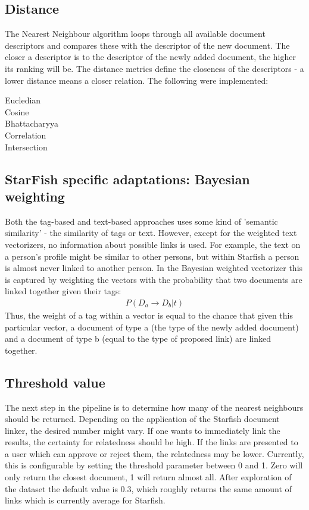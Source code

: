 \subsection{Distance}
The Nearest Neighbour algorithm loops through all available document descriptors and compares these with the descriptor of the new document. The closer a descriptor is to the descriptor of the newly added document, the higher its ranking will be. The distance metrics define the closeness of the descriptors - a lower distance means a closer relation. The following were implemented:

\begin{description}
\item[Eucledian]
\item[Cosine]
\item[Bhattacharyya]
\item[Correlation]
\item[Intersection]
\end{description}

\subsection{StarFish specific adaptations: Bayesian weighting}
Both the tag-based and text-based approaches uses some kind of 'semantic similarity' - the similarity of tags or text. However, except for the weighted text vectorizers, no information about possible links is used. For example, the text on a person's profile might be similar to other persons, but within Starfish a person is almost never linked to another person. In the Bayesian weighted vectorizer this is captured by weighting the vectors with the probability that two documents are linked together given their tags:
\begin{align}
\nonumber P(D_a \rightarrow D_b | t)
\end{align}
Thus, the weight of a tag within a vector is equal to the chance that given this particular vector, a document of type a (the type of the newly added document) and a document of type b (equal to the type of proposed link) are linked together.

\subsection{Threshold value}
The next step in the pipeline is to determine how many of the nearest neighbours should be returned. Depending on the application of the Starfish document linker, the desired number might vary. If one wants to immediately link the results, the certainty for relatedness should be high. If the links are presented to a user which can approve or reject them, the relatedness may be lower. Currently, this is configurable by setting the threshold parameter between 0 and 1. Zero will only return the closest document, 1 will return almost all. After exploration of the dataset the default value is 0.3, which roughly returns the same amount of links which is currently average for Starfish.
